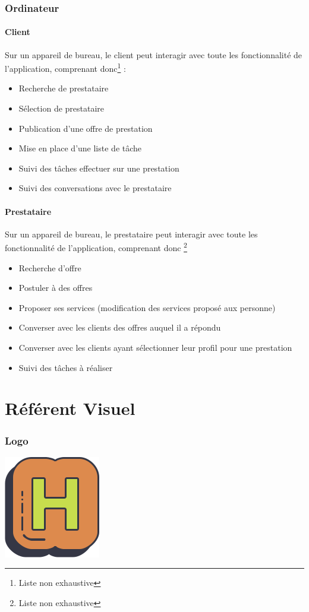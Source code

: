 \documentclass[a4paper,12pt]{article}
\begin{document}
\section{Ordinateur}

\subsection{Client}
Sur un appareil de bureau, le client peut interagir avec toute les fonctionnalité de l'application, comprenant donc\footnote{Liste non exhaustive} : 
\begin{itemize}
\item Recherche de prestataire
\item Sélection de prestataire
\item Publication d'une offre de prestation
\item Mise en place d'une liste de tâche
\item Suivi des tâches effectuer sur une prestation
\item Suivi des conversations avec le prestataire
\end{itemize}

\subsection{Prestataire}
Sur un appareil de bureau, le prestataire peut interagir avec toute les fonctionnalité de l'application, comprenant donc \footnote{Liste non exhaustive}
\begin{itemize}
\item Recherche d'offre
\item Postuler à des offres
\item Proposer ses services (modification des services proposé aux personne)
\item Converser avec les clients des offres auquel il a répondu
\item Converser avec les clients ayant sélectionner leur profil pour une prestation
\item Suivi des tâches à réaliser
\end{itemize}

\newpage
\part{Référent Visuel}

\section{Logo}
\includegraphics{sujet2.png}
\end{document}
